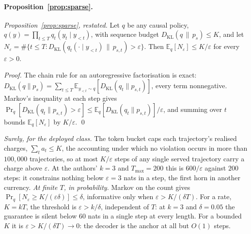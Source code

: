 \paragraph{Proposition~\ref{prop:sparse}.}
\noindent\emph{Proposition~\ref{prop:sparse}, restated.} Let $q$ be any causal policy,
$q(y) = \prod_{t \le T} q_t(y_t \mid y_{<t})$, with sequence budget
$D_{\mathrm{KL}}(q \,\|\, p_s) \le K$, and let
$N_\varepsilon = \#\{t \le T : D_{\mathrm{KL}}(q_t(\cdot \mid y_{<t}) \,\|\, p_{s,t}) > \varepsilon\}$.
Then $\mathbb{E}_q[N_\varepsilon] \le K/\varepsilon$ for every $\varepsilon > 0$.

\emph{Proof.} The chain rule for an autoregressive factorisation is exact:
$D_{\mathrm{KL}}(q \| p_s) = \sum_{t \le T} \mathbb{E}_{y_{<t} \sim q}[D_{\mathrm{KL}}(q_t \| p_{s,t})]$,
every term nonnegative. Markov's inequality at each step gives
$\Pr_q[D_{\mathrm{KL}}(q_t \| p_{s,t}) > \varepsilon] \le \mathbb{E}_q[D_{\mathrm{KL}}(q_t \| p_{s,t})]/\varepsilon$,
and summing over $t$ bounds $\mathbb{E}_q[N_\varepsilon]$ by $K/\varepsilon$. \qed

\emph{Surely, for the deployed class.} The token bucket caps each trajectory's realised charges,
$\sum_t a_t \le K$, the accounting under which no violation occurs in more than $100{,}000$ trajectories,
so at most $K/\varepsilon$ steps of any single served trajectory carry a charge above $\varepsilon$. At the
authors' $k=3$ and $T_{\max}=200$ this is $600/\varepsilon$ against $200$ steps: it constrains nothing below
$\varepsilon = 3$ nats in a step, the first horn in another currency. \emph{At finite $T$, in probability.}
Markov on the count gives $\Pr_q[N_\varepsilon \ge K/(\varepsilon\delta)] \le \delta$, informative only when
$\varepsilon > K/(\delta T)$. For a rate, $K = kT$, the threshold is $\varepsilon > k/\delta$, independent of
$T$: at $k = 3$ and $\delta = 0.05$ the guarantee is silent below $60$ nats in a single step at every
length. For a bounded $K$ it is $\varepsilon > K/(\delta T) \to 0$: the decoder is the anchor at all but
$O(1)$ steps.

